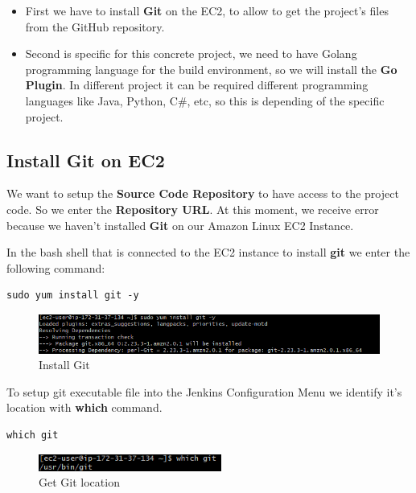 \documentclass[12pt,a4paper,twoside]{article}
\begin{document}
\begin{itemize}
	\item First we have to install \textbf{Git} on the EC2, to allow to get the project's files from the GitHub repository.

	\item Second is specific for this concrete project, we need to have Golang programming language for the build environment, so we will install the \textbf{Go Plugin}. In different project it can be required different programming languages like Java, Python, C\#, etc, so this is depending of the specific project.
\end{itemize}


\subsection{Install Git on EC2}


We want to setup the \textbf{Source Code Repository} to have access to the project code. So we enter the \textbf{Repository URL}.
At this moment, we receive error because we haven't installed \textbf{Git} on our  Amazon Linux EC2 Instance.


In the bash shell that is connected to the EC2 instance to install \textbf{git} we enter the following command:


\begin{verbatim}
sudo yum install git -y
\end{verbatim}


\begin{figure}[H]
    \centering
        \includegraphics[width=15cm]{images-aws/27-jenkins-install-git.png}
        \caption{Install Git}
\end{figure}


To setup git executable file into the Jenkins Configuration Menu we identify it's location with \textbf{which} command.


\begin{verbatim}
which git
\end{verbatim}


\begin{figure}[H]
    \centering
        \includegraphics[width=6cm]{images-aws/28-jenkins-git-on-local.png}
        \caption{Get Git location}
\end{figure}
\end{document}
